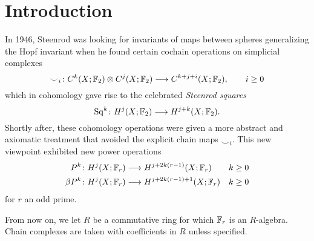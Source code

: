 
\section{Introduction} \label{s:introduction}

In 1946, Steenrod was looking for invariants of maps between spheres generalizing the Hopf invariant when he found certain cochain operations on simplicial complexes
\[\smile_i\colon C^k(X;\mathbb{F}_2)\otimes C^j(X;\mathbb{F}_2)\longrightarrow C^{k+j+i}(X;\mathbb{F}_2),\qquad i\geq 0\]
which in cohomology gave rise to the celebrated \emph{Steenrod squares}
\[\operatorname{Sq}^{k}\colon H^j(X;\mathbb{F}_2)\longrightarrow H^{j+k}(X;\mathbb{F}_2).\]
Shortly after, these cohomology operations were given a more abstract and axiomatic treatment that avoided the explicit chain maps $\smile_i$. This new viewpoint exhibited new power operations
\begin{align*}
	P^{k}\colon H^j(X;\mathbb{F}_r)&\longrightarrow H^{j+2k(r-1)}(X;\mathbb{F}_r) & k\geq 0 \\
	\beta P^k\colon H^j(X;\mathbb{F}_r)&\longrightarrow H^{j+2k(r-1)+1}(X;\mathbb{F}_r) & k\geq 0
\end{align*}
for $r$ an odd prime.

From now on, we let $R$ be a commutative ring for which $\mathbb{F}_r$ is an $R$-algebra. Chain complexes are taken with coefficients in $R$ unless specified.

